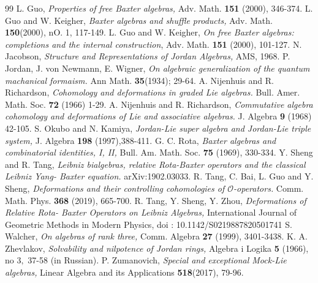 \documentclass[12pt]{amsart}
\begin{document}
\begin{thebibliography}{99}
		 L. Guo, {\it Properties of free Baxter algebras,} Adv. Math. {\bf 151} (2000), 346-374.
		 L. Guo and W. Keigher, {\it Baxter algebras and shuffle products,} Adv. Math. {\bf 150}(2000), nO. 1, 117-149.
		 L. Guo and W. Keigher, {\it On free Baxter algebras: completions and the internal construction}, Adv. Math. {\bf 151}
		(2000), 101-127.
		 N. Jacobson, {\it Structure and Representations of Jordan Algebras,} AMS, 1968.
		 P. Jordan, J. von Newmann, E. Wigner, {\it On algebraic generalization of the quantum machanical formaism.} Ann Math. {\bf 35}(1934); 29-64.
		 A. Nijenhuis and R. Richardson, {\it Cohomology and deformations in graded Lie algebras.} Bull. Amer. Math.
		Soc. {\bf 72} (1966) 1-29.
		 A. Nijenhuis and R. Richardson, {\it Commutative algebra cohomology and deformations of Lie and associative
		algebras.} J. Algebra {\bf 9} (1968) 42-105.
		 S. Okubo and N. Kamiya, {\it Jordan-Lie super algebra and Jordan-Lie triple system,} J. Algebra {\bf 198} (1997),388-411.
		 G. C. Rota, {\it Baxter algebras and combinatorial identities, I, II,}  Bull. Am. Math. Soc. {\bf 75} (1969), 330-334.
		  Y. Sheng and R. Tang, {\it Leibniz bialgebras, relative Rota-Baxter operators and the classical Leibniz Yang-
		Baxter equation.} arXiv:1902.03033. 
	     R. Tang, C. Bai, L. Guo and Y. Sheng, {\it Deformations and their controlling cohomologies of $\mathcal{O}$-operators.} Comm.
	    Math. Phys. {\bf 368} (2019), 665-700.
	     R. Tang, Y. Sheng, Y. Zhou, {\it Deformations of Relative Rota- Baxter Operators on Leibniz Algebras,} International Journal of Geometric Methods in Modern Physics, doi : 10.1142/S0219887820501741
		 S. Walcher, {\it On algebras of rank three,} Comm. Algebra {\bf 27 } (1999), 3401-3438.
		 K. A. Zhevlakov, {\it Solvability and nilpotence of Jordan rings,} Algebra i Logika {\bf 5} (1966),
		no $3,$ 37-58 (in Russian).
		 P. Zumanovich, {\it Special and exceptional Mock-Lie algebras,} Linear Algebra and its Applications  {\bf 518}(2017), 79-96.
	\end{thebibliography}
\end{document}
